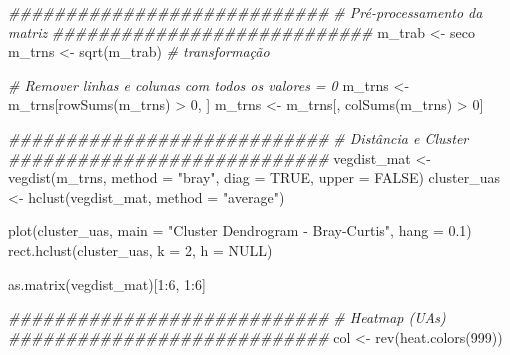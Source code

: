 \documentclass[
  letterpaper,
  DIV=11,
  numbers=noendperiod]{scrartcl}
\newenvironment{Shaded}{}{}
\newcommand{\AttributeTok}[1]{\textcolor[rgb]{0.49,0.56,0.16}{#1}}
\newcommand{\CommentTok}[1]{\textcolor[rgb]{0.38,0.63,0.69}{\textit{#1}}}
\newcommand{\ConstantTok}[1]{\textcolor[rgb]{0.53,0.00,0.00}{#1}}
\newcommand{\DecValTok}[1]{\textcolor[rgb]{0.25,0.63,0.44}{#1}}
\newcommand{\DocumentationTok}[1]{\textcolor[rgb]{0.73,0.13,0.13}{\textit{#1}}}
\newcommand{\FloatTok}[1]{\textcolor[rgb]{0.25,0.63,0.44}{#1}}
\newcommand{\FunctionTok}[1]{\textcolor[rgb]{0.02,0.16,0.49}{#1}}
\newcommand{\NormalTok}[1]{#1}
\newcommand{\OtherTok}[1]{\textcolor[rgb]{0.00,0.44,0.13}{#1}}
\newcommand{\SpecialCharTok}[1]{\textcolor[rgb]{0.25,0.44,0.63}{#1}}
\newcommand{\StringTok}[1]{\textcolor[rgb]{0.25,0.44,0.63}{#1}}
\begin{document}
\begin{Shaded}
\begin{Highlighting}[numbers=left,,]
\DocumentationTok{\#\#\#\#\#\#\#\#\#\#\#\#\#\#\#\#\#\#\#\#\#\#\#\#\#\#\#\#}
\CommentTok{\# Pré{-}processamento da matriz}
\DocumentationTok{\#\#\#\#\#\#\#\#\#\#\#\#\#\#\#\#\#\#\#\#\#\#\#\#\#\#\#\#}
\NormalTok{m\_trab }\OtherTok{\textless{}{-}}\NormalTok{ seco}
\NormalTok{m\_trns }\OtherTok{\textless{}{-}} \FunctionTok{sqrt}\NormalTok{(m\_trab) }\CommentTok{\# transformação}

\CommentTok{\# Remover linhas e colunas com todos os valores = 0}
\NormalTok{m\_trns }\OtherTok{\textless{}{-}}\NormalTok{ m\_trns[}\FunctionTok{rowSums}\NormalTok{(m\_trns) }\SpecialCharTok{\textgreater{}} \DecValTok{0}\NormalTok{, ]}
\NormalTok{m\_trns }\OtherTok{\textless{}{-}}\NormalTok{ m\_trns[, }\FunctionTok{colSums}\NormalTok{(m\_trns) }\SpecialCharTok{\textgreater{}} \DecValTok{0}\NormalTok{]}

\DocumentationTok{\#\#\#\#\#\#\#\#\#\#\#\#\#\#\#\#\#\#\#\#\#\#\#\#\#\#\#\#}
\CommentTok{\# Distância e Cluster}
\DocumentationTok{\#\#\#\#\#\#\#\#\#\#\#\#\#\#\#\#\#\#\#\#\#\#\#\#\#\#\#\#}
\NormalTok{vegdist\_mat }\OtherTok{\textless{}{-}} \FunctionTok{vegdist}\NormalTok{(m\_trns, }\AttributeTok{method =} \StringTok{"bray"}\NormalTok{, }\AttributeTok{diag =} \ConstantTok{TRUE}\NormalTok{, }\AttributeTok{upper =} \ConstantTok{FALSE}\NormalTok{)}
\NormalTok{cluster\_uas }\OtherTok{\textless{}{-}} \FunctionTok{hclust}\NormalTok{(vegdist\_mat, }\AttributeTok{method =} \StringTok{"average"}\NormalTok{)}

\FunctionTok{plot}\NormalTok{(cluster\_uas, }\AttributeTok{main =} \StringTok{"Cluster Dendrogram {-} Bray{-}Curtis"}\NormalTok{, }\AttributeTok{hang =} \FloatTok{0.1}\NormalTok{)}
\FunctionTok{rect.hclust}\NormalTok{(cluster\_uas, }\AttributeTok{k =} \DecValTok{2}\NormalTok{, }\AttributeTok{h =} \ConstantTok{NULL}\NormalTok{)}

\FunctionTok{as.matrix}\NormalTok{(vegdist\_mat)[}\DecValTok{1}\SpecialCharTok{:}\DecValTok{6}\NormalTok{, }\DecValTok{1}\SpecialCharTok{:}\DecValTok{6}\NormalTok{]}

\DocumentationTok{\#\#\#\#\#\#\#\#\#\#\#\#\#\#\#\#\#\#\#\#\#\#\#\#\#\#\#\#}
\CommentTok{\# Heatmap (UAs)}
\DocumentationTok{\#\#\#\#\#\#\#\#\#\#\#\#\#\#\#\#\#\#\#\#\#\#\#\#\#\#\#\#}
\NormalTok{col }\OtherTok{\textless{}{-}} \FunctionTok{rev}\NormalTok{(}\FunctionTok{heat.colors}\NormalTok{(}\DecValTok{999}\NormalTok{))}


\end{Highlighting}
\end{Shaded}
\end{document}
